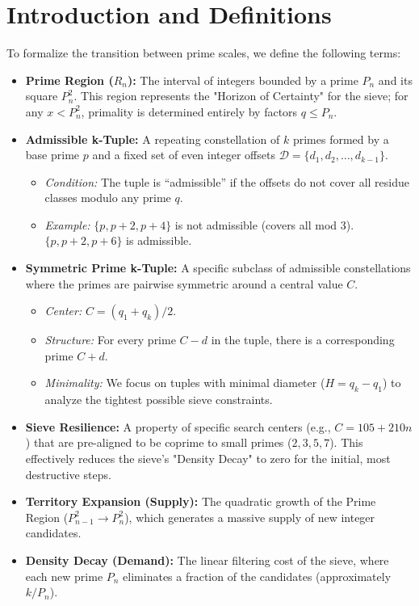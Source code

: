 \documentclass[sn-mathphys-num, pdflatex]{sn-jnl}
\begin{document}
\section{Introduction and Definitions}

To formalize the transition between prime scales, we define the following terms:

\begin{itemize}
    \item \textbf{Prime Region ($R_{n}$):} The interval of integers bounded by a prime $P_{n}$ and its square $P_{n}^{2}$. This region represents the "Horizon of Certainty" for the sieve; for any $x < P_{n}^{2}$, primality is determined entirely by factors $q \le P_{n}$.

    \item \textbf{Admissible k-Tuple:} A repeating constellation of $k$ primes formed by a base prime $p$ and a fixed set of even integer offsets $\mathcal{D} = \{d_1, d_2, \dots, d_{k-1}\}$.
    \begin{itemize}
        \item \textit{Condition:} The tuple is ``admissible'' if the offsets do not cover all residue classes modulo any prime $q$.
        \item \textit{Example:} $\{p, p+2, p+4\}$ is not admissible (covers all mod 3). $\{p, p+2, p+6\}$ is admissible.
    \end{itemize}

    \item \textbf{Symmetric Prime k-Tuple:} A specific subclass of admissible constellations where the primes are pairwise symmetric around a central value $C$.
    \begin{itemize}
        \item \textit{Center:} $C = (q_1 + q_k)/2$.
        \item \textit{Structure:} For every prime $C-d$ in the tuple, there is a corresponding prime $C+d$.
        \item \textit{Minimality:} We focus on tuples with minimal diameter ($H = q_k - q_1$) to analyze the tightest possible sieve constraints.
    \end{itemize}

    \item \textbf{Sieve Resilience:} A property of specific search centers (e.g., $C = 105 + 210n$) that are pre-aligned to be coprime to small primes ($2, 3, 5, 7$). This effectively reduces the sieve's "Density Decay" to zero for the initial, most destructive steps.

    \item \textbf{Territory Expansion (Supply):} The quadratic growth of the Prime Region ($P_{n-1}^2 \to P_{n}^2$), which generates a massive supply of new integer candidates.

    \item \textbf{Density Decay (Demand):} The linear filtering cost of the sieve, where each new prime $P_{n}$ eliminates a fraction of the candidates (approximately $k/P_{n}$).
\end{itemize}
\end{document}
